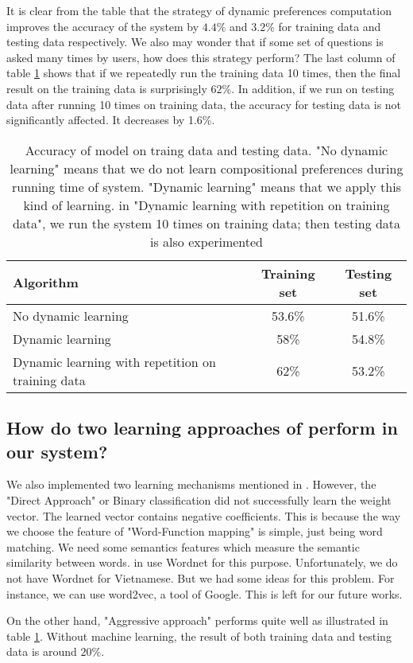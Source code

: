 It is clear from the table that the strategy of dynamic preferences computation improves the accuracy of the system by $4.4\%$ and $3.2\%$ for training data and testing data respectively. We also may wonder that if some set of questions is asked many times by users, how does this strategy perform? The last column of table \ref{d-c-p-eff} shows that if we repeatedly run the training data 10 times, then the final result on the training data is surprisingly $62\%$. In addition, if we run on testing data after running 10 times on training data, the accuracy for testing data is not significantly affected. It decreases by 1.6\%. 
\begin{table}[h] 
	\begin{center}
	    \begin{tabular}{| p{5cm} | c | c |}
	    \hline
	    Algorithm & Training set & Testing set \\ \hline
		No dynamic learning & 53.6\% & 51.6\%  \\ \hline
	    Dynamic learning & 58\% & 54.8\%  \\ \hline
	    Dynamic learning with repetition on training data & 62\% & 53.2\%  \\
	    \hline
	    \end{tabular}        
	\end{center}
	\scriptsize
	\caption{Accuracy of model on traing data and testing data. "No dynamic learning" means that we do not learn compositional preferences during running time of system. "Dynamic learning" means that we apply this kind of learning. in "Dynamic learning with repetition on training data", we run the system 10 times on training data; then testing data is also experimented}
    \label{d-c-p-eff}
\end{table}

\subsection{How do two learning approaches of \cite{Clarke:2010:DSP:1870568.1870571} perform in our system?}
We also implemented two learning mechanisms mentioned in \cite{Clarke:2010:DSP:1870568.1870571}. However, the "Direct Approach" or Binary classification did not successfully learn the weight vector. The learned vector contains negative coefficients. This is because the way we choose the feature of "Word-Function mapping" is simple, just being word matching. We need some semantics features which measure the semantic similarity between words. \citeauthor{Clarke:2010:DSP:1870568.1870571} in \cite{Clarke:2010:DSP:1870568.1870571} use Wordnet for this purpose. Unfortunately, we do not have Wordnet for Vietnamese. But we had some ideas for this problem. For instance, we can use word2vec, a tool of Google. This is left for our future works.

On the other hand, "Aggressive approach" performs quite well as illustrated in table \ref{d-c-p-eff}. Without machine learning, the result of both training data and testing data is around $20\%$.